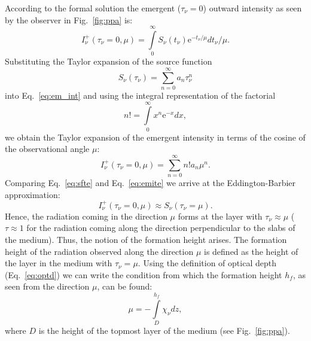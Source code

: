 \documentclass[paper=a4, fontsize=11pt]{article}
\numberwithin{equation}{section}
\numberwithin{figure}{section}
\numberwithin{table}{section}
\begin{document}
According to the formal solution the emergent ($\tau_\nu = 0$) outward intensity as seen by the observer in Fig.~\ref{fig:ppa} is:
\begin{equation}\label{eq:em_int}
I_\nu^+(\tau_\nu = 0, \mu) = \int\limits_0^\infty S_\nu(t_\nu)\mbox{e}^{-t_\nu / \mu}dt_\nu / \mu.
\end{equation}
Substituting the Taylor expansion of the source function
\begin{equation}\label{eq:sfte}
S_\nu(\tau_\nu) = \sum\limits_{n=0}^\infty a_n\tau_\nu^n
\end{equation}
into Eq.~\eqref{eq:em_int} and using the integral representation of the factorial
\begin{equation}
n! = \int\limits_0^\infty x^n\mbox{e}^{-x}dx,
\end{equation}
we obtain the Taylor expansion of the emergent intensity in terms of the cosine of the observational angle $\mu$:
\begin{equation}\label{eq:emite}
I_\nu^+(\tau_\nu = 0, \mu) = \sum\limits_{n=0}^\infty n!a_n\mu^n.
\end{equation}
Comparing Eq.~\eqref{eq:sfte} and Eq.~\eqref{eq:emite} we arrive at the Eddington-Barbier approximation:
\begin{equation}\label{eq:eb_app}
I_\nu^+(\tau_\nu = 0, \mu) \approx S_\nu(\tau_\nu = \mu).
\end{equation}
Hence, the radiation coming in the direction $\mu$ forms at the layer with $\tau_\nu\approx\mu$
($\tau\approx 1$ for the radiation coming along the direction perpendicular to the slabs of the medium).
Thus, the notion of the formation height arises.
The formation height of the radiation observed along the direction $\mu$ is defined as the height of the layer in the medium with $\tau_\nu = \mu$.
Using the definition of optical depth (Eq.~\ref{eq:optd}) we can write the
condition from which the formation height $h_f$, as seen from the direction $\mu$, can be found:
\begin{equation}
\mu = -\int\limits_D^{h_f}\chi_\nu dz,
\end{equation}
where $D$ is the height of the topmost layer of the medium (see Fig.~\ref{fig:ppa}).

\printbibliography
\end{document}
